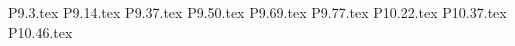\documentclass[12pt]{scrartcl}
\begin{document}
{P9.3.tex}
{P9.14.tex}
{P9.37.tex}
{P9.50.tex}
{P9.69.tex}
{P9.77.tex}
{P10.22.tex}
{P10.37.tex}
{P10.46.tex}
\end{document}
